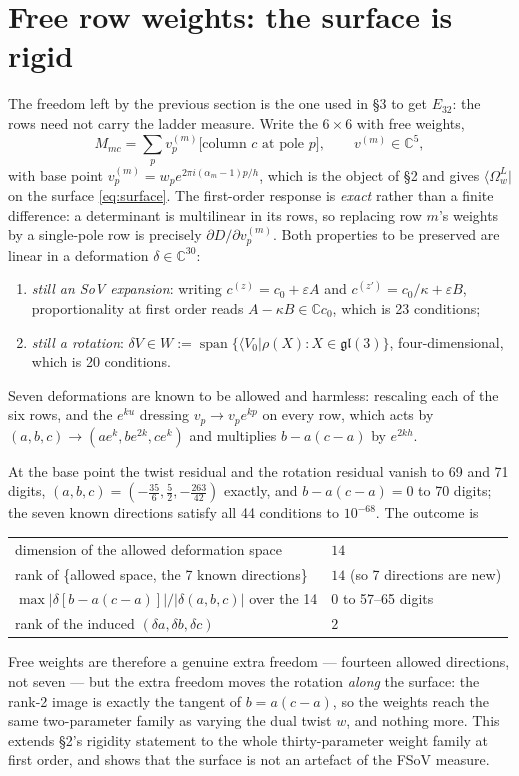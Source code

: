 \documentclass[11pt]{article}
\newcommand{\gl}{\mathfrak{gl}}
\newcommand{\bra}[1]{\langle #1|}
\begin{document}
\section{Free row weights: the surface is rigid}

The freedom left by the previous section is the one used in \S3 to get $E_{32}$: the rows need not
carry the ladder measure. Write the $6\times6$ with free weights,
\begin{equation}
M_{mc}=\sum_pv^{(m)}_p\big[\text{column }c\text{ at pole }p\big],\qquad v^{(m)}\in\mathbb{C}^5,
\end{equation}
with base point $v^{(m)}_p=w_pe^{2\pi i(\alpha_m-1)p/h}$, which is the object of \S2 and gives
$\bra{\Omega^L_w}$ on the surface \eqref{eq:surface}. The first-order response is \emph{exact} rather
than a finite difference: a determinant is multilinear in its rows, so replacing row $m$'s weights by
a single-pole row is precisely $\partial D/\partial v^{(m)}_p$. Both properties to be preserved are
linear in a deformation $\delta\in\mathbb{C}^{30}$:
\begin{enumerate}
\item \emph{still an SoV expansion}: writing $c^{(z)}=c_0+\varepsilon A$ and
$c^{(z')}=c_0/\kappa+\varepsilon B$, proportionality at first order reads $A-\kappa B\in\mathbb{C}c_0$,
which is 23 conditions;
\item \emph{still a rotation}: $\delta V\in W:=\operatorname{span}\{\bra{V_0}\rho(X):X\in\gl(3)\}$,
four-dimensional, which is 20 conditions.
\end{enumerate}
Seven deformations are known to be allowed and harmless: rescaling each of the six rows, and the
$e^{ku}$ dressing $v_p\to v_pe^{kp}$ on every row, which acts by $(a,b,c)\to(ae^k,be^{2k},ce^k)$ and
multiplies $b-a(c-a)$ by $e^{2kh}$.

At the base point the twist residual and the rotation residual vanish to 69 and 71 digits,
$(a,b,c)=(-\tfrac{35}{6},\tfrac52,-\tfrac{263}{42})$ exactly, and $b-a(c-a)=0$ to 70 digits; the seven
known directions satisfy all 44 conditions to $10^{-68}$. The outcome is
\begin{center}
\begin{tabular}{ll}
\toprule
dimension of the allowed deformation space & $14$\\
rank of \{allowed space, the 7 known directions\} & $14$ (so 7 directions are new)\\
$\max\big|\delta[b-a(c-a)]\big|\big/\big|\delta(a,b,c)\big|$ over the 14 & $0$ to 57--65 digits\\
rank of the induced $(\delta a,\delta b,\delta c)$ & $2$\\
\bottomrule
\end{tabular}
\end{center}
Free weights are therefore a genuine extra freedom --- fourteen allowed directions, not seven --- but
the extra freedom moves the rotation \emph{along} the surface: the rank-2 image is exactly the tangent
of $b=a(c-a)$, so the weights reach the same two-parameter family as varying the dual twist $w$, and
nothing more. This extends \S2's rigidity statement to the whole thirty-parameter weight family at
first order, and shows that the surface is not an artefact of the FSoV measure.
\end{document}
